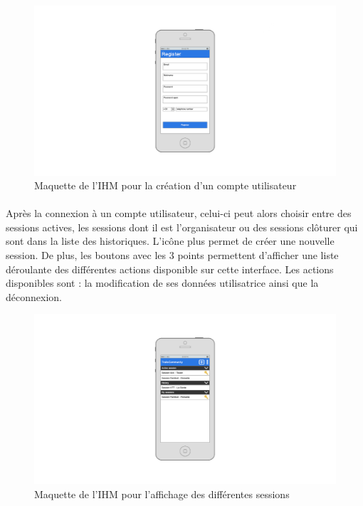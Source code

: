 \documentclass[titlepage, 12pt]{report}
\begin{document}
\begin{figure}[!h]
	\caption{Maquette de l'IHM pour la création d'un compte utilisateur}
	\label{create_user_account}
	\centering
	\includegraphics[scale=0.3]{images/mockups/register.png}
\end{figure}

\clearpage

\paragraph{}Après la connexion à un compte utilisateur, celui-ci peut alors choisir entre des sessions actives, les sessions dont il est l'organisateur ou des sessions clôturer qui sont dans la liste des historiques. L'icône plus permet de créer une nouvelle session. De plus, les boutons avec les 3 points permettent d'afficher une liste déroulante des différentes actions disponible sur cette interface. Les actions disponibles sont : la modification de ses données utilisatrice ainsi que la déconnexion.

\begin{figure}[!h]
	\caption{Maquette de l'IHM pour l'affichage des différentes sessions}
	\label{all_sessions}
	\centering
	\includegraphics[scale=0.3]{images/mockups/session_view.png}
\end{figure}
\end{document}
